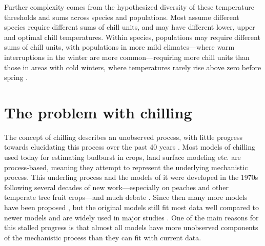 \documentclass[11pt]{article}
\begin{document}
Further complexity comes from the hypothesized diversity of these temperature thresholds and sums across species and populations. Most assume different species require different sums of chill units, and may have different lower, upper and optimal chill temperatures. Within species, populations may require different sums of chill units, with populations in more mild climates---where warm interruptions in the winter are more common---requiring more chill units than those in areas with cold winters, where temperatures rarely rise above zero before spring \citep{campbell1979,leinonen1996dependence}. 

\section*{The problem with chilling} 
The concept of chilling describes an unobserved process, with little progress towards elucidating this process over the past 40 years \citep{chuine2016,hanninen2019experiments}. 
Most models of chilling used today for estimating budburst in crops, land surface modeling etc. are process-based, meaning they attempt to represent the underlying mechanistic process. 
This underling process and the models of it were developed in the 1970s \citep{richardson1974} following several decades of new work---especially on peaches and other temperate tree fruit crops---and much debate \citep{dormtreeproc}. Since then many more models have been proposed \citep{luedeling2012chilling,chuine2016}, but the original models still fit most data well compared to newer models \citep{basler2016evaluating,chuine2016} and are widely used in major studies \citep[e.g.,][]{richardson1974,chuine2016,ospreebbms}. One of the main reasons for this stalled progress is that almost all models have more unobserved components of the mechanistic process than they can fit with current data. 
\end{document}
